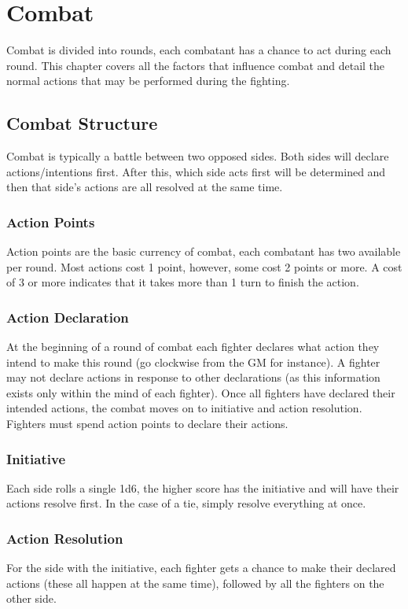 \documentclass[a4paper,10pt,oneside]{book}
\begin{document}
\chapter{Combat}
\label{chap:combat}
Combat is divided into rounds, each combatant has a chance to act during each round. This chapter covers all the factors that influence combat and detail the normal actions that may be performed during the fighting.

\section{Combat Structure}
Combat is typically a battle between two opposed sides. Both sides will declare actions/intentions first. After this, which side acts first will be determined and then that side's actions are all resolved at the same time.  

\subsection{Action Points}
Action points are the basic currency of combat, each combatant has two available per round. Most actions cost 1 point, however, some cost 2 points or more. A cost of 3 or more indicates that it takes more than 1 turn to finish the action.

\subsection{Action Declaration}
At the beginning of a round of combat each fighter declares what action they intend to make this round (go clockwise from the GM for instance). A fighter may not declare actions in response to other declarations (as this information exists only within the mind of each fighter). Once all fighters have declared their intended actions, the combat moves on to initiative and action resolution. Fighters must spend action points to declare their actions.

\subsection{Initiative}
Each side rolls a single 1d6, the higher score has the initiative and will have their actions resolve first. In the case of a tie, simply resolve everything at once.

\subsection{Action Resolution}
For the side with the initiative, each fighter gets a chance to make their declared actions (these all happen at the same time), followed by all the fighters on the other side.  
\end{document}
